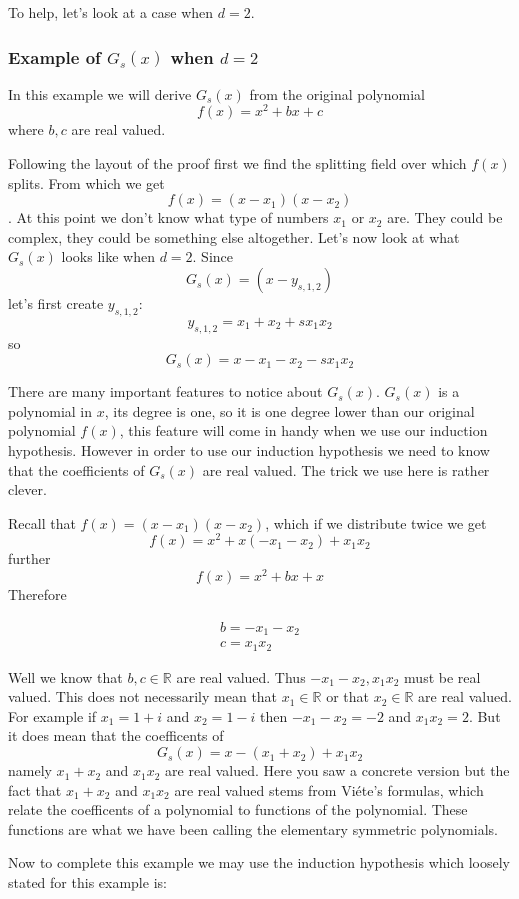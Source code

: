 \documentclass[12pt]{article}
\begin{document}
To help, let's look at a case when $d=2$.
\subsubsection*{Example of $G_s(x)$ when $d=2$ }  In this example we will derive $G_s(x)$ from the original polynomial $$f(x)=x^2+bx+c$$ where $b, c$ are real valued.  

Following the layout of the proof first we find the splitting field over which $f(x)$ splits.  From which we get $$f(x)=(x-x_1)(x-x_2)$$.  At this point we don't know what type of numbers $x_1$ or $x_2$ are.  They could be complex, they could be something else altogether.  Let's now look at what $G_s(x)$ looks like when $d=2$.  Since $$G_s(x) = (x-y_{s,1,2})$$ let's first create $y_{s,1,2}$: $$y_{s,1,2} = x_1 +x_2 + s x_1 x_2$$ so $$G_s(x) = x- x_1 -x_2 - s x_1 x_2$$

There are many important features to notice about $G_s(x)$.  $G_s(x)$ is a polynomial in $x$, its degree is one, so it is one degree lower than our original polynomial $f(x)$, this feature will come in handy when we use our induction hypothesis.  However in order to use our induction hypothesis we need to know that the coefficients of $G_s(x)$ are real valued.  The trick we use here is rather clever.

Recall that $f(x) = (x-x_1)(x-x_2)$, which if we distribute twice we get $$f(x)= x^2 + x(-x_1-x_2)+ x_1x_2$$
further
$$f(x) = x^2 +bx + x$$
Therefore

\begin{align*}
b = -x_1-x_2 \\ 
c = x_1 x_2
\end{align*}

Well we know that $b, c \in \mathbb{R}$ are real valued.  Thus $-x_1-x_2, x_1x_2$ must be real valued.  This does not necessarily mean that $x_1 \in \mathbb{R}$ or that $x_2 \in \mathbb{R}$ are real valued.  For example if $x_1=1+i$ and $x_2 = 1-i$ then $-x_1-x_2=-2$ and $x_1x_2 = 2$.  But it does mean that the coefficents of $$G_s(x) = x-(x_1+x_2)+x_1 x_2$$
namely $x_1+x_2$ and $x_1 x_2$ are real valued.  Here you saw a concrete version but the fact that $x_1+x_2$ and $x_1 x_2$ are real valued stems from Vi\'ete's formulas, which relate the coefficents of a polynomial to functions of the polynomial.  These functions are what we have been calling the elementary symmetric polynomials.

Now to complete this example we may use the induction hypothesis which loosely stated for this example is: 
\end{document}
